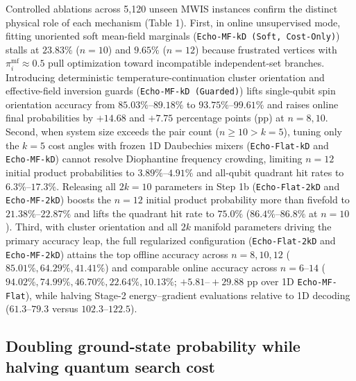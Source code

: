 \documentclass[10pt,a4paper]{article}
\begin{document}
Controlled ablations across 5,120 unseen MWIS instances confirm the distinct physical role of each mechanism (Table 1). First, in online unsupervised mode, fitting unoriented soft mean-field marginals (\texttt{Echo-MF-kD (Soft,\allowbreak\ Cost-Only)}) stalls at $23.83\%$ ($n=10$) and $9.65\%$ ($n=12$) because frustrated vertices with $\pi_i^{\mathrm{mf}} \approx 0.5$ pull optimization toward incompatible independent-set branches. Introducing deterministic temperature-continuation cluster orientation and effective-field inversion guards (\texttt{Echo-MF-kD (Guarded)}) lifts single-qubit spin orientation accuracy from $85.03\%\mbox{--}89.18\%$ to $93.75\%\mbox{--}99.61\%$ and raises online final probabilities by $+14.68$ and $+7.75$ percentage points (pp) at $n=8, 10$. Second, when system size exceeds the pair count ($n \ge 10 > k = 5$), tuning only the $k=5$ cost angles with frozen 1D Daubechies mixers (\texttt{Echo-Flat-kD} and \texttt{Echo-MF-kD}) cannot resolve Diophantine frequency crowding, limiting $n=12$ initial product probabilities to $3.89\%\mbox{--}4.91\%$ and all-qubit quadrant hit rates to $6.3\%\mbox{--}17.3\%$. Releasing all $2k=10$ parameters in Step 1b (\texttt{Echo-Flat-2kD} and \texttt{Echo-MF-2kD}) boosts the $n=12$ initial product probability more than fivefold to $21.38\%\mbox{--}22.87\%$ and lifts the quadrant hit rate to $75.0\%$ ($86.4\%\mbox{--}86.8\%$ at $n=10$). Third, with cluster orientation and all $2k$ manifold parameters driving the primary accuracy leap, the full regularized configuration (\texttt{Echo-Flat-2kD} and \texttt{Echo-MF-2kD}) attains the top offline accuracy across $n=8, 10, 12$ ($\mathbf{85.01}\%, \mathbf{64.29}\%, \mathbf{41.41}\%$) and comparable online accuracy across $n=6\mbox{--}14$ ($\mathbf{94.02}\%, \mathbf{74.99}\%, 46.70\%, 22.64\%, 10.13\%$; $+5.81\mbox{--}{+}29.88$ pp over 1D \texttt{Echo-MF-Flat}), while halving Stage-2 energy--gradient evaluations relative to 1D decoding ($\mathbf{61.3\mbox{--}79.3}$ versus $102.3\mbox{--}122.5$).


\subsection*{Doubling ground-state probability while halving quantum search cost}
\end{document}
